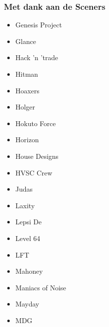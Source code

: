 \begin{frame}
\frametitle{Met dank aan de Sceners}

\begin{multicols}{3}
\begin{itemize}
\item Genesis Project
\item Glance
\item Hack 'n 'trade
\item Hitman
\item Hoaxers
\item Holger
\item Hokuto Force
\item Horizon
\item House Designs
\item HVSC Crew
\item Judas
\item Laxity
\item Lepsi De
\item Level 64
\item LFT
\item Mahoney
\item Maniacs of Noise
\item Mayday
\item MDG
\end{itemize}
\end{multicols}

\end{frame}


